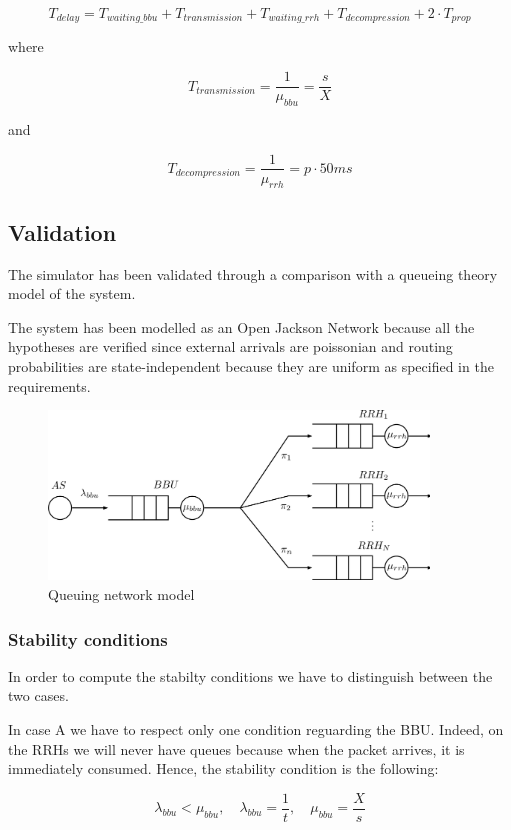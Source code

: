 \documentclass[11pt,a4paper,oneside, openright]{article}
\begin{document}
$$ T_{delay} =  T_{waiting\_bbu} + T_{transmission} + T_{waiting\_rrh} + T_{decompression} + 2 \cdot T_{prop} $$

where 

$$ T_{transmission} = \frac{1}{\mu_{bbu}} = \frac{s}{X} $$

and

$$ T_{decompression} = \frac{1}{\mu_{rrh}} = p \cdot 50ms $$

\subsection{Validation}
The simulator has been validated through a comparison with a queueing theory model of the system.

The system has been modelled as an Open Jackson Network because all the hypotheses are verified since external arrivals are poissonian and routing probabilities are state-independent because they are uniform as specified in the requirements.

\begin{figure}[h]
    \centering
    \includegraphics[width=0.9\textwidth]{images/model}
    \caption{Queuing network model}
    \label{fig:model}
\end{figure}

\subsubsection{Stability conditions}
In order to compute the stabilty conditions we have to distinguish between the two cases.

In case A we have to respect only one condition reguarding the BBU. Indeed, on the RRHs we will never have queues because when the packet arrives, it is immediately consumed.
Hence, the stability condition is the following:

$$ \lambda_{bbu} < \mu_{bbu}, \quad \lambda_{bbu} = \frac{1}{t}, \quad \mu_{bbu} = \frac{X}{s}$$
\end{document}
